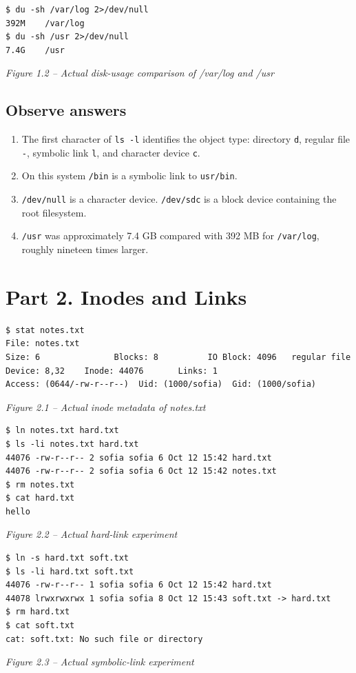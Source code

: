 \documentclass[12pt,a4paper]{article}
\newcommand{\figcap}[1]{\begin{center}\small\textit{#1}\end{center}\vspace{0.4em}}
\begin{document}
\begin{lstlisting}
$ du -sh /var/log 2>/dev/null
392M    /var/log
$ du -sh /usr 2>/dev/null
7.4G    /usr
\end{lstlisting}
\figcap{Figure 1.2 -- Actual disk-usage comparison of /var/log and /usr}

\subsection{Observe answers}
\begin{enumerate}[label=\arabic*.]
\item The first character of \texttt{ls -l} identifies the object type: directory \texttt{d}, regular file \texttt{-}, symbolic link \texttt{l}, and character device \texttt{c}.
\item On this system \texttt{/bin} is a symbolic link to \texttt{usr/bin}.
\item \texttt{/dev/null} is a character device. \texttt{/dev/sdc} is a block device containing the root filesystem.
\item \texttt{/usr} was approximately 7.4 GB compared with 392 MB for \texttt{/var/log}, roughly nineteen times larger.
\end{enumerate}

\section{Part 2. Inodes and Links}
\begin{lstlisting}
$ stat notes.txt
File: notes.txt
Size: 6               Blocks: 8          IO Block: 4096   regular file
Device: 8,32    Inode: 44076       Links: 1
Access: (0644/-rw-r--r--)  Uid: (1000/sofia)  Gid: (1000/sofia)
\end{lstlisting}
\figcap{Figure 2.1 -- Actual inode metadata of notes.txt}

\begin{lstlisting}
$ ln notes.txt hard.txt
$ ls -li notes.txt hard.txt
44076 -rw-r--r-- 2 sofia sofia 6 Oct 12 15:42 hard.txt
44076 -rw-r--r-- 2 sofia sofia 6 Oct 12 15:42 notes.txt
$ rm notes.txt
$ cat hard.txt
hello
\end{lstlisting}
\figcap{Figure 2.2 -- Actual hard-link experiment}

\begin{lstlisting}
$ ln -s hard.txt soft.txt
$ ls -li hard.txt soft.txt
44076 -rw-r--r-- 1 sofia sofia 6 Oct 12 15:42 hard.txt
44078 lrwxrwxrwx 1 sofia sofia 8 Oct 12 15:43 soft.txt -> hard.txt
$ rm hard.txt
$ cat soft.txt
cat: soft.txt: No such file or directory
\end{lstlisting}
\figcap{Figure 2.3 -- Actual symbolic-link experiment}
\end{document}
